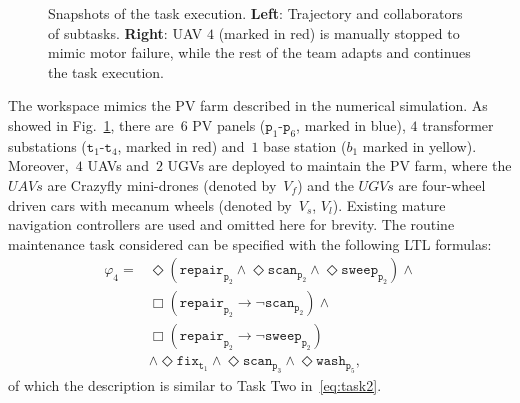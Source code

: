 \begin{figure}[t!]
\begin{minipage}[t]{0.49\linewidth}
\end{minipage}%
\caption{Snapshots of the task execution. \textbf{Left}:
Trajectory and collaborators of subtasks.
\textbf{Right}: UAV $4$ (marked in red) is manually stopped to mimic motor failure,
while the rest of the team adapts and continues
the task execution.}
\label{fig:ws}
\end{figure}

The workspace mimics the PV farm described in the numerical simulation.
As showed in Fig.~\ref{fig:ws},
there are~$6$ PV panels ($\texttt{p}_1$-$\texttt{p}_6$, marked in blue),
$4$ transformer substations
($\texttt{t}_1$-$\texttt{t}_4$, marked in red)
and~$1$ base station ($b_1$ marked in yellow).
Moreover,~$4$ UAVs and~$2$ UGVs are deployed to maintain the PV farm,
where the $UAVs$ are Crazyfly mini-drones (denoted by~$V_f$) and
the $UGVs$ are four-wheel driven cars with mecanum wheels (denoted by~$V_s$, $V_l$).
Existing mature navigation controllers are used and omitted here for brevity.
The routine maintenance task considered can be specified with the following LTL formulas:
\begin{equation}
\begin{aligned}
	\varphi_4=& \Diamond(\texttt{repair}_{\texttt{p}_2} \land \Diamond
	\texttt{scan}_{\texttt{p}_2} \land \Diamond \texttt{sweep}_{\texttt{p}_2})\land\\
	& \Box (\texttt{repair}_{\texttt{p}_2} \rightarrow \lnot\texttt{scan}_{\texttt{p}_2} ) \land \\
	& \Box (\texttt{repair}_{\texttt{p}_2} \rightarrow \lnot\texttt{sweep}_{\texttt{p}_2}) \\
	& \land \Diamond \texttt{fix}_{\texttt{t}_1} \land \Diamond \texttt{scan}_{\texttt{p}_3}
	\land \Diamond \texttt{wash}_{\texttt{p}_5},
\end{aligned}
\end{equation}
of which the description is similar to Task Two in~\eqref{eq:task2}.

